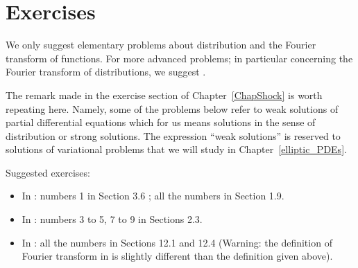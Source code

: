 \section{Exercises}

We only suggest elementary problems about distribution and the Fourier
transform of functions.  For more advanced problems; in particular
concerning the Fourier transform of distributions, we suggest
\cite{ReeSim,RuFA}.

The remark made in the exercise section of Chapter~\ref{ChapShock} is
worth repeating here.  Namely, some of the problems below refer to
weak solutions of partial differential equations which for us means
solutions in the sense of distribution or strong solutions. 
The expression ``weak solutions'' is reserved to solutions of
variational problems that we will study in Chapter~\ref{elliptic_PDEs}.

Suggested exercises:

\begin{itemize}
\item In \cite{J}: numbers 1 in Section 3.6 ; all the numbers
in Section 1.9.
\item In \cite{McO}: numbers 3 to 5, 7 to 9 in Sections 2.3.
\item In \cite{Str}: all the numbers in Sections 12.1 and 12.4
(Warning: the definition of Fourier transform in \cite{Str} is
slightly different than the definition given above).
\end{itemize}


